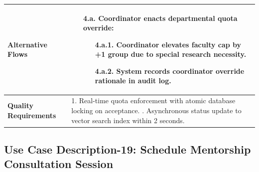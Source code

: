 \begin{table}[H]
\begin{tabularx}{\textwidth}{|l|X|}
\textbf{Alternative Flows} &
\begin{itemize}[leftmargin=*]
    \item[\textbf{4.a.}] \textbf{Coordinator enacts departmental quota override:}
    \begin{itemize}[leftmargin=*]
        \item[4.a.1.] Coordinator elevates faculty cap by +1 group due to special research necessity.
        \item[4.a.2.] System records coordinator override rationale in audit log.
    \end{itemize}
\end{itemize} \\ \hline
\textbf{Quality Requirements} & 
1. Real-time quota enforcement with atomic database locking on acceptance. \newline
2. Asynchronous status update to vector search index within 2 seconds. \\ \hline
\end{tabularx}
\end{table}

\clearpage
\subsection{Use Case Description-19: Schedule Mentorship Consultation Session}
\label{subsec:uc19}

